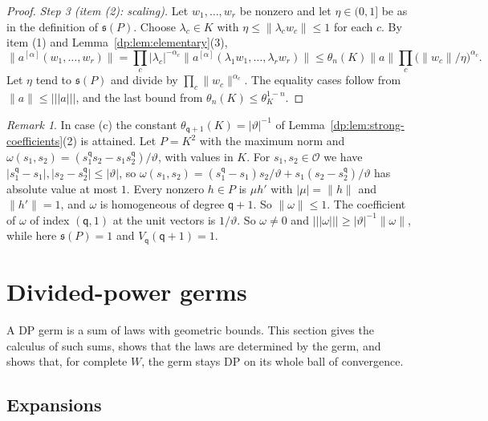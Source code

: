 \documentclass[11pt]{amsart}
\theoremstyle{definition}
\theoremstyle{remark}
\newtheorem{remark}[theorem]{Remark}
\numberwithin{equation}{section}
\newcommand{\abs}[1]{\lvert #1\rvert}
\newcommand{\norm}[1]{\lVert #1\rVert}
\theoremstyle{plain}
\theoremstyle{definition}
\theoremstyle{plain}
\begin{document}
\begin{proof}
\emph{Step 3 (item (2): scaling).} Let $w_1,\dots,w_r$ be nonzero and let $\eta\in(0,1]$ be as in the definition of $\mathfrak s(P)$. Choose $\lambda_c\in K$ with $\eta\le\norm{\lambda_cw_c}\le1$ for each $c$. By item (1) and Lemma~\ref{dp:lem:elementary}(3),
\[
 \norm{a^{[\alpha]}(w_1,\dots,w_r)}=\prod_c\abs{\lambda_c}^{-\alpha_c}\norm{a^{[\alpha]}(\lambda_1w_1,\dots,\lambda_rw_r)}\le\theta_n(K)\norm a\prod_c\bigl(\norm{w_c}/\eta\bigr)^{\alpha_c}.
\]
Let $\eta$ tend to $\mathfrak s(P)$ and divide by $\prod_c\norm{w_c}^{\alpha_c}$. The equality cases follow from $\norm a\le\lvert\!\lvert\!\lvert a\rvert\!\rvert\!\rvert$, and the last bound from $\theta_n(K)\le\theta_K^{1-n}$.
\end{proof}

\begin{remark}
In case (c) the constant $\theta_{\mathsf q+1}(K)=\abs\vartheta^{-1}$ of Lemma~\ref{dp:lem:strong-coefficients}(2) is attained. Let $P=K^2$ with the maximum norm and $\omega(s_1,s_2)=(s_1^{\mathsf q}s_2-s_1s_2^{\mathsf q})/\vartheta$, with values in $K$. For $s_1,s_2\in\mathcal O$ we have $\abs{s_1^{\mathsf q}-s_1},\abs{s_2-s_2^{\mathsf q}}\le\abs\vartheta$, so $\omega(s_1,s_2)=(s_1^{\mathsf q}-s_1)s_2/\vartheta+s_1(s_2-s_2^{\mathsf q})/\vartheta$ has absolute value at most $1$. Every nonzero $h\in P$ is $\mu h'$ with $\abs\mu=\norm h$ and $\norm{h'}=1$, and $\omega$ is homogeneous of degree $\mathsf q+1$. So $\norm\omega\le1$. The coefficient of $\omega$ of index $(\mathsf q,1)$ at the unit vectors is $1/\vartheta$. So $\omega\ne0$ and $\lvert\!\lvert\!\lvert\omega\rvert\!\rvert\!\rvert\ge\abs\vartheta^{-1}\norm\omega$, while here $\mathfrak s(P)=1$ and $V_{\mathsf q}(\mathsf q+1)=1$.
\end{remark}
\section{Divided-power germs}\label{dp:sec:germs}

A DP germ is a sum of laws with geometric bounds. This section gives the calculus of such sums, shows that the laws are determined by the germ, and shows that, for complete $W$, the germ stays DP on its whole ball of convergence.

\subsection{Expansions}\label{dp:ssec:expansions}
\end{document}
